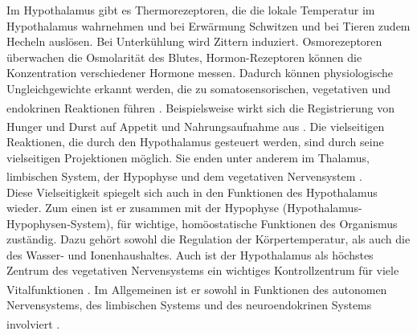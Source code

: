 \documentclass[12pt,a4paper,pdftex]{article}
\begin{document}
\noindent Im Hypothalamus gibt es Thermorezeptoren, die die lokale Temperatur im Hypothalamus wahrnehmen und bei Erwärmung Schwitzen und bei Tieren zudem Hecheln auslösen. Bei Unterkühlung wird Zittern induziert. Osmorezeptoren überwachen die Osmolarität des Blutes, Hormon-Rezeptoren können die Konzentration verschiedener Hormone messen. Dadurch können physiologische Ungleichgewichte erkannt werden, die zu somatosensorischen, vegetativen und endokrinen Reaktionen führen \textsuperscript{\cite[14]{penzlin2005tierphys}}. Beispielsweise wirkt sich die Registrierung von Hunger und Durst auf Appetit und Nahrungsaufnahme aus \textsuperscript{\cite[6]{storch2012lehrbuchzoo}}. Die vielseitigen Reaktionen, die durch den Hypothalamus gesteuert werden, sind durch seine vielseitigen Projektionen möglich. Sie enden unter anderem im Thalamus, limbischen System, der Hypophyse und dem vegetativen Nervensystem \textsuperscript{\cite[16]{crossman2014neuroanatomy}}. \\

\noindent Diese Vielseitigkeit spiegelt sich auch in den Funktionen des Hypothalamus wieder. Zum einen ist er zusammen mit der Hypophyse (Hypothalamus-Hypophysen-System), für wichtige, homöostatische Funktionen des Organismus zuständig. Dazu gehört sowohl die Regulation der Körpertemperatur, als auch die des Wasser- und Ionenhaushaltes. Auch ist der Hypothalamus als höchstes Zentrum des vegetativen Nervensystems ein wichtiges Kontrollzentrum für viele Vitalfunktionen \textsuperscript{\cite[14]{penzlin2005tierphys}}. Im Allgemeinen ist er sowohl in Funktionen des autonomen Nervensystems, des limbischen Systems und des neuroendokrinen Systems involviert \textsuperscript{\cite[16]{crossman2014neuroanatomy}}.
 
\end{document}
